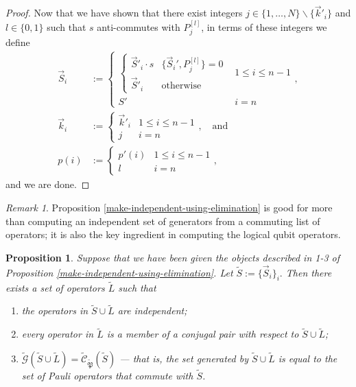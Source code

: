 \documentclass[12pt]{amsbook}
\theoremstyle{plain}
\newtheorem{proposition}{Proposition}
\theoremstyle{definition}
\theoremstyle{remark}
\newtheorem{remark}{Remark}
\newcommand{\lst}{\vec}
\newcommand{\set}{\tilde}
\newcommand{\genfun}{\tilde{\mathcal{G}}}
\newcommand{\pauligroup}{{\set{\mathfrak{P}}}}
\newcommand{\centralizer}{\set{\mathcal{C}}}
\newcommand{\paren}[1]{\left(#1\right)}
\begin{document}
\begin{proof}
Now that we have shown that there exist integers $j\in\{1,\dots,N\}\backslash\{\lst k'_i\}$ and $l\in\{0,1\}$ such that $s$ anti-commutes with $P_{j}^{[l]}$, in terms of these integers we define
$$
\begin{aligned}
\lst S_i &:= 
\begin{cases}
\begin{cases}
\lst S'_i \cdot s & \{\lst S_i',P_j^{[l]}\}=0 \\
\lst S'_i & \text{otherwise}
\end{cases} & 1\le i\le n-1 \\
S' & i=n
\end{cases}, \\
\lst k_i &:=
\begin{cases}
\lst k'_i & 1 \le i \le n-1 \\
j & i=n
\end{cases},\quad \text{and} \\
p(i) &:=
\begin{cases}
p'(i) & 1 \le i \le n-1\\
l & i=n
\end{cases},
\end{aligned}
$$ and we are done.
\end{proof}
\begin{remark}
Proposition \ref{make-independent-using-elimination} is good for more than computing an independent set of generators from a commuting list of operators;  it is also the key ingredient in computing the logical qubit operators.
\end{remark}

\begin{proposition}
\label{construction-of-logicals}
Suppose that we have been given the objects described in 1-3 of Proposition \ref{make-independent-using-elimination}.  Let $\set S := \{\vec S_i\}_i.$  Then there exists a set of operators $\set L$ such that
\begin{enumerate}
\item \label{L-are-independent} the operators in $\set S\cup\set L$ are independent;
\item \label{L-are-conjugal-pairs} every operator in $\set L$ is a member of a conjugal pair with respect to $\set S\cup\set L$;
\item \label{L-completes-the-generators} $\genfun\paren{\set S\cup\set L}=\centralizer_\pauligroup(\set S)$ --- that is, the set generated by $\set S\cup\set L$ is equal to the set of Pauli operators that commute with $\set S$.
\end{enumerate}
\end{proposition}
\end{document}
